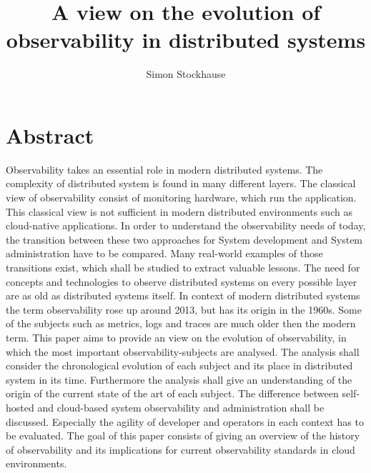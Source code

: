 \documentclass[11pt, manuscript, screen, nonacm=true, natbib=true]{acmart-backref}
\begin{document}
\title{ A view on the evolution of observability in distributed systems }

\author{Simon Stockhause}




  

\maketitle

\section{Abstract}
 Observability takes an essential role in modern distributed systems. The complexity of distributed system is found in many different layers. The classical view of observability consist of monitoring hardware, which run the application. This classical view is not sufficient in modern distributed environments such as cloud-native applications. In order to understand the observability needs of today, the transition between these two approaches for System development and System administration have to be compared. Many real-world examples of those transitions exist, which shall be studied to extract valuable lessons.\cite{Thingbo2016}\cite{Hedman2016}\cite{GHOLAMI201631} The need for concepts and technologies to observe distributed systems on every possible layer are as old as distributed systems itself. In context of modern distributed systems the term observability rose up around 2013, but has its origin in the 1960s.\cite{KALMAN1960491} Some of the subjects such as metrics, logs and traces are much older then the modern term. This paper aims to provide an view on the evolution of observability, in which the most important observability-subjects are analysed. The analysis shall consider the chronological evolution of each subject and its place in distributed system in its time. Furthermore the analysis shall give an understanding of the origin of the current state of the art of each subject. The difference between self-hosted and cloud-based system observability and administration shall be discussed. Especially the agility of developer and operators in each context has to be evaluated. The goal of this paper consists of giving an overview of the history of observability and its implications for current observability standards in cloud environments.
\end{document}
